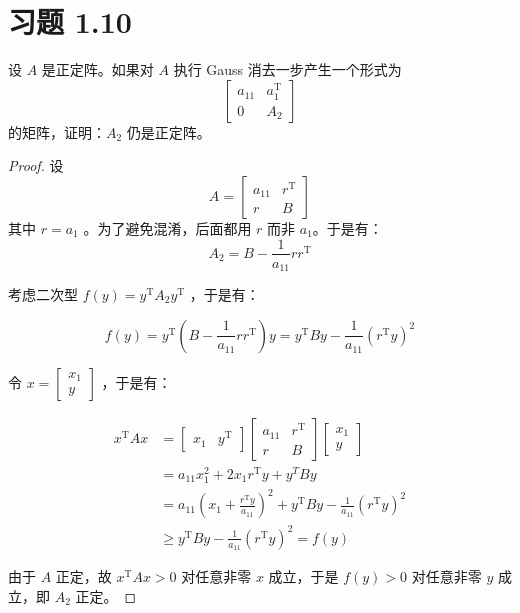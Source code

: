 \documentclass{article}
\newcommand{\T}{\mathrm{T}}
\newcommand{\vecTwo}[2]{
  \begin{bmatrix}
    #1 \\
    #2
\end{bmatrix}}
\newcommand{\vecTwoH}[2]{
  \begin{bmatrix}
    #1 & #2
  \end{bmatrix}
}
\begin{document}
\section{习题 1.10}
设 $A$ 是正定阵。如果对 $A$ 执行 Gauss 消去一步产生一个形式为
\[
  \begin{bmatrix}
    a_{11} & a_1^{\mathrm{T}} \\
    0 & A_2
  \end{bmatrix}
\]
的矩阵，证明：$A_2$ 仍是正定阵。

\begin{proof}
  设
  \[
    A =
    \begin{bmatrix}
      a_{11} & r^{\T} \\
      r & B
    \end{bmatrix}
  \]
  其中 $r = a_1$ 。为了避免混淆，后面都用 $r$ 而非 $a_1$。于是有：
  \[
    A_2 = B - \frac{1}{a_{11}}r r^{\T}
  \]

  考虑二次型 $f(y) = y^{\T} A_2 y^{\T}$ ，于是有：

  \[
    f(y) = y^{\T} (B - \frac{1}{a_{11}} r r^{\T}) y = y^{\T}By - \frac{1}{a_{11}} (r^{\T}y)^2
  \]

  令 $x = \vecTwo{x_1}{y}$ ，于是有：

  \[
    \begin{aligned}
      x^{\T}Ax &= \vecTwoH{x_1}{y^{\T}}
      \begin{bmatrix}
        a_{11} & r^{\T} \\
        r & B
      \end{bmatrix} \vecTwo{x_1}{y} \\
      &= a_{11} x_1^2 + 2x_1 r^{\T} y + y^T B y \\
      &= a_{11} (x_1 + \frac{r^{\T}y}{a_{11}})^2 + y^{\T} B y - \frac{1}{a_{11}} (r^{\T}y)^2 \\
      &\geq y^{\T} B y - \frac{1}{a_{11}} (r^{\T}y)^2 = f(y)
    \end{aligned}
  \]

  由于 $A$ 正定，故 $x^{\T} A x > 0$ 对任意非零 $x$ 成立，于是 $f(y) > 0$ 对任意非零 $y$ 成立，即 $A_2$ 正定。

\end{proof}
\end{document}
